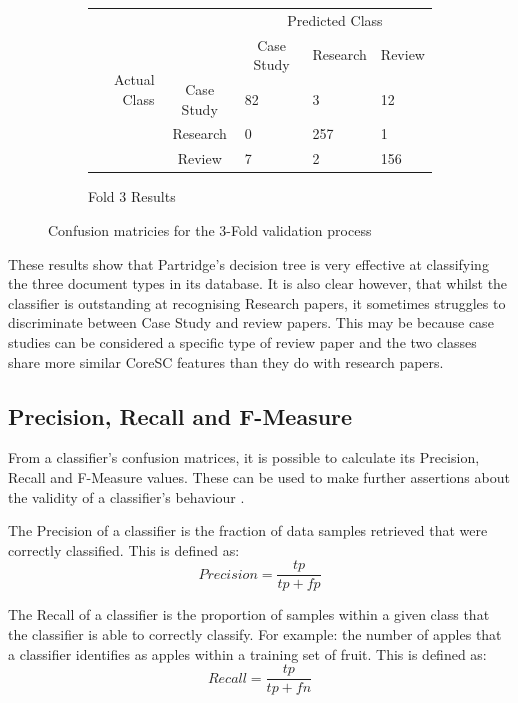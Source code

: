\begin{figure}[!h]
\begin{subfigure}[b]{\textwidth}
\end{subfigure}

\begin{subfigure}[b]{\textwidth}

\caption{Fold 3 Results}
\centering
\begin{tabular}{ | r l l l l |}
\hline
\multirow{5}{*}{\begin{sideways}{Actual Class}\end{sideways}}
&&\multicolumn{3}{c|}{Predicted Class} \\
&& \multicolumn{1}{c}{Case Study} &	Research&	\multicolumn{1}{c|}{Review}\\
\cline{3-5}
&\multicolumn{1}{c|}{Case Study}&	82&		3	&	12 \\
&\multicolumn{1}{c|}{Research}&	0&		257	&	1\\
&\multicolumn{1}{c|}{Review}&		7&		2	&	156\\
\hline
\end{tabular}

\end{subfigure}

\caption{ Confusion matricies for the 3-Fold validation process}
\label{fig:conf_matrices}

\end{figure}

These results show that Partridge's decision tree is very effective at
classifying the three document types in its database. It is also clear however,
that whilst the classifier is outstanding at recognising Research papers, it
sometimes struggles to discriminate between Case Study and review papers. This
may be because case studies can be considered a specific type of review paper
and the two classes share more similar CoreSC features than they do with
research papers.  

\subsection{ Precision, Recall and F-Measure }

From a classifier's confusion matrices, it is possible to calculate its
Precision, Recall and F-Measure values. These can be used to make further
assertions about the validity of a classifier's behaviour
\cite{witten2005data}.

The Precision of a classifier is the fraction of data samples retrieved that
were correctly classified. This is defined as:
\[Precision = \frac{tp}{tp+fp} \]

The Recall of a classifier is the proportion of samples within a given class
that the classifier is able to correctly classify. For example: the number of
apples that a classifier identifies as apples within a training set of fruit.
This is defined as:
\[Recall = \frac{tp}{tp+fn} \]

